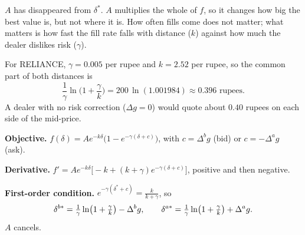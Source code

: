 \begin{intuition}
$A$ has disappeared from $\delta^*$. $A$ multiplies the whole of $f$, so it changes how big the best value is, but not where it is. How often fills come does not matter; what matters is how fast the fill rate falls with distance ($k$) against how much the dealer dislikes risk ($\gamma$).
\end{intuition}

\begin{example}
For RELIANCE, $\gamma=0.005$ per rupee and $k=2.52$ per rupee, so the common part of both distances is
\[
  \frac1\gamma\ln\!\Big(1+\frac\gamma k\Big)=200\,\ln(1.001984)\approx0.396\text{ rupees}.
\]
A dealer with no risk correction ($\Delta g=0$) would quote about $0.40$ rupees on each side of the mid-price.
\end{example}

\begin{recall}
\textbf{Objective.} $f(\delta)=Ae^{-k\delta}\big(1-e^{-\gamma(\delta+c)}\big)$, with $c=\Delta^bg$ (bid) or $c=-\Delta^ag$ (ask).

\textbf{Derivative.} $f'=Ae^{-k\delta}\big[-k+(k+\gamma)e^{-\gamma(\delta+c)}\big]$, positive and then negative.

\textbf{First-order condition.} $e^{-\gamma(\delta^*+c)}=\frac{k}{k+\gamma}$, so
\[
  \delta^{b*}=\tfrac{1}{\gamma}\ln\!\big(1+\tfrac{\gamma}{k}\big)-\Delta^bg,\qquad \delta^{a*}=\tfrac{1}{\gamma}\ln\!\big(1+\tfrac{\gamma}{k}\big)+\Delta^ag .
\]
$A$ cancels.
\end{recall}
